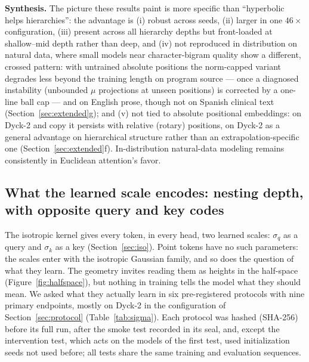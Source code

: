 \documentclass[11pt]{article}
\begin{document}
\textbf{Synthesis.} The picture these results paint is more specific than ``hyperbolic helps hierarchies'': the advantage is (i) robust across seeds, (ii) larger in one $46\times$ configuration, (iii) present across all hierarchy depths but front-loaded at shallow--mid depth rather than deep, and (iv) not reproduced in distribution on natural data, where small models near character-bigram quality show a different, crossed pattern: with untrained absolute positions the norm-capped variant degrades less beyond the training length on program source --- once a diagnosed instability (unbounded $\mu$ projections at unseen positions) is corrected by a one-line ball cap --- and on English prose, though not on Spanish clinical text (Section~\ref{sec:extended}g); and (v) not tied to absolute positional embeddings: on Dyck-2 and copy it persists with relative (rotary) positions, on Dyck-2 as a general advantage on hierarchical structure rather than an extrapolation-specific one (Section~\ref{sec:extended}f). In-distribution natural-data modeling remains consistently in Euclidean attention's favor.

\subsection{What the learned scale encodes: nesting depth, with opposite query and key codes}\label{sec:sigma}

The isotropic kernel gives every token, in every head, two learned scales: $\sigma_q$ as a query and $\sigma_k$ as a key (Section~\ref{sec:iso}). Point tokens have no such parameters: the scales enter with the isotropic Gaussian family, and so does the question of what they learn. The geometry invites reading them as heights in the half-space (Figure~\ref{fig:halfspace}), but nothing in training tells the model what they should mean. We asked what they actually learn in six pre-registered protocols with nine primary endpoints, mostly on Dyck-2 in the configuration of Section~\ref{sec:protocol} (Table~\ref{tab:sigma}). Each protocol was hashed (SHA-256) before its full run, after the smoke test recorded in its seal, and, except the intervention test, which acts on the models of the first test, used initialization seeds not used before; all tests share the same training and evaluation sequences.
\end{document}
